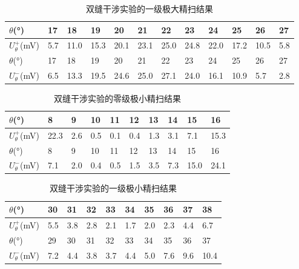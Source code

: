 \documentclass[zihao=5, UTF8]{article}
\theoremstyle{MyLineTheoremStyle} %
\theoremstyle{MyBlockTheoremStyle} %
\theoremstyle{MySubsubsectionStyle} %
\begin{document}
\begin{table}[H]
    \centering
    \begin{tabularx}{\textwidth}{|X|*{11}{X|}} %
        \hline
        \(\theta\)(°) & 17 & 18 & 19 & 20 & 21 & 22 & 23 & 24 & 25 & 26 & 27 \\ %
        \hline
        \(U_\theta^+\)(mV) & 5.7 & 11.0 & 15.3 & 20.1 & 23.1 & 25.0 & 24.8 & 22.0 & 17.2 & 10.5 & 5.8 \\ %
        \hline
        \(\theta\)(°) & 17 & 18 & 19 & 20 & 21 & 22 & 23 & 24 & 25 & 26 & 27 \\ %
        \hline
        \(U_\theta^-\)(mV) & 6.5 & 13.3 & 19.5 & 24.6 & 25.0 & 27.1 & 24.0 & 16.1 & 10.9 & 5.7 & 2.8 \\ %
        \hline
    \end{tabularx}
    \caption{双缝干涉实验的一级极大精扫结果} %
    \label{双缝干涉实验的一级极大精扫结果表} %
\end{table}

\begin{table}[H]
    \centering
    \begin{tabularx}{\textwidth}{|X|*{9}{X|}} %
        \hline
        \(\theta\)(°) & 8 & 9 & 10 & 11 & 12 & 13 & 14 & 15 & 16 \\ %
        \hline
        \(U_\theta^+\)(mV) & 22.3 & 2.6 & 0.5 & 0.1 & 0.4 & 1.3 & 3.1 & 7.1 & 15.3 \\ %
        \hline
        \(\theta\)(°) & 8 & 9 & 10 & 11 & 12 & 13 & 14 & 15 & 16 \\ %
        \hline
        \(U_\theta^-\)(mV) & 7.1 & 2.0 & 0.4 & 0.5 & 1.5 & 3.5 & 7.3 & 15.0 & 24.1 \\ %
        \hline
    \end{tabularx}
    \caption{双缝干涉实验的零级极小精扫结果} %
    \label{双缝干涉实验的零级极小精扫结果表} %
\end{table}

\begin{table}[H]
    \centering
    \begin{tabularx}{\textwidth}{|X|*{9}{X|}} %
        \hline
        \(\theta\)(°) & 30 & 31 & 32 & 33 & 34 & 35 & 36 & 37 & 38 \\ %
        \hline
        \(U_\theta^+\)(mV) & 5.5 & 3.8 & 2.8 & 2.1 & 1.7 & 2.0 & 2.3 & 4.4 & 6.7 \\ %
        \hline
        \(\theta\)(°) & 29 & 30 & 31 & 32 & 33 & 34 & 35 & 36 & 37 \\ %
        \hline
        \(U_\theta^-\)(mV) & 7.2 & 4.4 & 3.8 & 3.7 & 4.4 & 5.0 & 7.6 & 9.6 & 10.4 \\ %
        \hline
    \end{tabularx}
    \caption{双缝干涉实验的一级极小精扫结果} %
    \label{双缝干涉实验的一级极小精扫结果表} %
\end{table}
\end{document}
